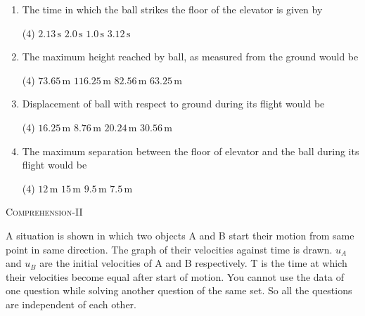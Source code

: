 \documentclass{article}
\begin{document}
\begin{enumerate}
    \item The time in which the ball strikes the floor of the elevator is given by
    	\begin{tasks}(4)
    		\task $2.13 \, \text{s}$
    		\task $2.0 \, \text{s}$
    		\task $1.0 \, \text{s}$
    		\task $3.12 \, \text{s}$
    	\end{tasks}
    	
    \item The maximum height reached by ball, as measured from the ground would be
    	\begin{tasks}(4)
    		\task $73.65 \, \text{m}$
    		\task $116.25 \, \text{m}$
    		\task $82.56 \, \text{m}$
    		\task $63.25 \, \text{m}$
    	\end{tasks}
    	
    \item Displacement of ball with respect to ground during its flight would be
    	\begin{tasks}(4)
    		\task $16.25 \, \text{m}$
    		\task $8.76 \, \text{m}$
    		\task $20.24 \, \text{m}$
    		\task $30.56 \, \text{m}$
    	\end{tasks}
    	
    \item The maximum separation between the floor of elevator and the ball during its flight would be
    	\begin{tasks}(4)
    		\task $12 \, \text{m}$
    		\task $15 \, \text{m}$
    		\task $9.5 \, \text{m}$
    		\task $7.5 \, \text{m}$
    	\end{tasks}
\end{enumerate}

\vspace*{10 mm}

\begin{center}
    \textsc{Comprehension-II}
\end{center}
A situation is shown in which two objects A and B start their motion from same point in same direction. The graph of their velocities against time is drawn. $u_A$ and $u_B$ are the initial velocities of A and B respectively. T is the time at which their velocities become equal after start of motion. You cannot use the data of one question while solving another question of the same set. So all the questions are independent of each other.
\end{document}
